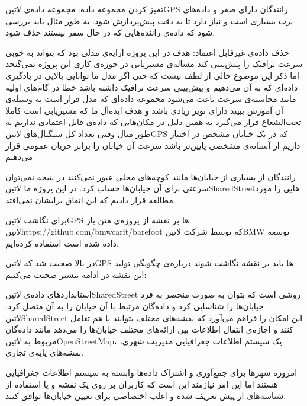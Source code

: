  تمیز کردن مجموعه داده: مجموعه داده‌ی ‌لاتین{GPS} رانندگان دارای صفر و داده‌های پرت بسیاری است و نیاز دارد تا به دقت پیش‌پردازش شود. به طور مثال باید بررسی شود که داده‌ی راننده‌هایی که در حال سفر نیستند حذف شود.

 حذف داده‌ی غیرقابل اعتماد: هدف در این پروژه ارایه‌ی مدلی بود که بتواند به خوبی سرعت ترافیک را پیش‌بینی کند مساله‌ی مسیریابی در حوزه‌ی کاری این پروژه نمی‌گنجد
اما ذکر این موضوع خالی از لطف نیست که حتی اگر مدل ما توانایی بالایی در یادگیری داده‌ای که به آن می‌دهیم و پیش‌بینی سرعت ترافیک داشته باشد خطا در گام‌های اولیه مانند محاسبه‌ی سرعت باعث می‌شود
مجموعه داده‌ای که مدل قرار است به وسیله‌ی آن آموزش ببیند دارای نویز زیادی باشد و هدف ایده‌آل ما که مسیریابی است کاملا تحت‌الشعاع قرار می‌گیرد
به همین دلیل در مکان‌هایی که داده‌ی قابل اعتمادی نداریم به طور مثال وقتی تعداد کل سیگنال‌های ‌لاتین{GPS} که در یک خیابان مشخص در اختیار داریم از آستانه‌ی مشخصی پایین‌تر باشد سرعت آن خیابان را برابر جریان عمومی قرار می‌دهیم

 رانندگان از بسیاری از خیابان‌ها مانند کوچه‌های محلی  عبور نمی‌کنند در نتیجه نمی‌توان سرعتی برای آن خیابان‌ها حساب کرد. در این پروژه ما ‌لاتین{SharedStreet}‌هایی را مورد مطالعه قرار دادیم که این اتفاق برایشان نمی‌افتد.

 برای نگاشت ‌لاتین{GPS} ها بر نقشه از پروژه‌ی متن باز ‌لاتین{https://github.com/bmwcarit/barefoot} که توسط شرکت ‌لاتین{BMW} توسعه داده شده است استفاده کرده‌ایم.


در بالا صحبت شد که ‌لاتین{GPS} ها باید بر نقشه نگاشت شوند درباره‌ی چگونگی تولید این نقشه در ادامه بیشتر صحبت می‌کنیم:


استانداردهای داده‌ی ‌لاتین{SharedStreet} روشی است که بتوان به صورت منحصر به فرد خیابان‌ها را شناسایی کرد و داده‌گان مرتبط با آن خیابان را به آن متصل کرد. ‌لاتین{SharedStreet} این امکان را فراهم می‌آورد که نقشه‌های مختلف بتوانند با هم تعامل کنند و اجازه‌ی انتقال اطلاعات بین ارائه‌های مختلف خیابان‌ها را می‌دهد مانند داده‌گان مربوط به ‌لاتین{OpenStreetMap}، یک سیستم اطلاعات جغرافیایی مدیریت شهری، نقشه‌های پایه‌ی تجاری.

امروزه شهرها برای جمع‌آوری و اشتراک داده‌ها وابسته به سیستم اطلاعات جغرافیایی هستند اما این امر نیازمند این است که کاربران بر روی یک نقشه و یا استفاده از شناسه‌های از پیش تعریف شده و اغلب اختصاصی برای تعیین خیابان‌ها توافق کنند.

